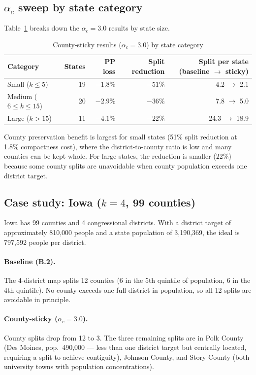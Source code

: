 \subsection[alpha-c sweep by state category]{$\alpha_c$ sweep by state category}

Table~\ref{tab:by-category} breaks down the $\alpha_c = 3.0$ results by
state size.

\begin{table}[htb]
\centering
\caption{County-sticky results ($\alpha_c = 3.0$) by state category}
\label{tab:by-category}
\begin{tabular}{lrrrr}
\toprule
Category & States & PP loss & Split reduction & Split per state (baseline $\to$ sticky) \\
\midrule
Small ($k \leq 5$)    & 19 & $-1.8\%$ & $-51\%$ & 4.2 $\to$ 2.1 \\
Medium ($6 \leq k \leq 15$) & 20 & $-2.9\%$ & $-36\%$ & 7.8 $\to$ 5.0 \\
Large ($k > 15$)      & 11 & $-4.1\%$ & $-22\%$ & 24.3 $\to$ 18.9 \\
\bottomrule
\end{tabular}
\end{table}

County preservation benefit is largest for small states (51\% split
reduction at 1.8\% compactness cost), where the district-to-county ratio
is low and many counties can be kept whole.  For large states, the
reduction is smaller (22\%) because some county splits are unavoidable
when county population exceeds one district target.

\subsection[Case study: Iowa]{Case study: Iowa ($k{=}4$, 99 counties)}

Iowa has 99 counties and 4 congressional districts.  With a district target
of approximately 810,000 people and a state population of 3,190,369, the
ideal is 797,592 people per district.

\paragraph{Baseline (B.2).}
The 4-district map splits 12 counties (6 in the 5th quintile of
population, 6 in the 4th quintile).  No county exceeds one full district
in population, so all 12 splits are avoidable in principle.

\paragraph{County-sticky ($\alpha_c = 3.0$).}
County splits drop from 12 to 3.  The three remaining splits are in
Polk County (Des Moines, pop.\ 490,000 --- less than one district target
but centrally located, requiring a split to achieve contiguity), Johnson
County, and Story County (both university towns with population
concentrations).

